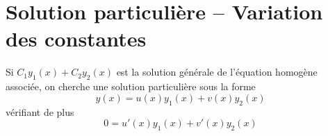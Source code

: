 \documentclass[french,oneside,twocolumn,article]{memoir} %
\begin{document}
\section{Solution particulière -- Variation des constantes}
Si $C_{1} y_{1}(x) + C_{2} y_{2}(x)$ est la solution générale de l'équation homogène associée, on cherche une solution particulière sous la forme
\begin{equation*}
  y(x) = u(x) y_{1}(x) + v(x) y_{2}(x)
\end{equation*}
vérifiant de plus
\begin{equation*}
 0 = u'(x) y_{1}(x) + v'(x) y_{2}(x)
\end{equation*}
\end{document}
